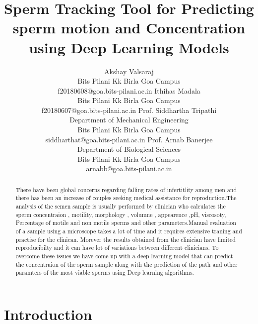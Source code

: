 \documentclass{article}
\title{
  Sperm Tracking Tool for Predicting sperm motion and Concentration using Deep Learning Models 
}
\author{%
  Akshay Valsaraj \\
  Bits Pilani Kk Birla Goa Campus\\
  f20180608@goa.bits-pilani.ac.in
  \And
  Ithihas Madala \\
  Bits Pilani Kk Birla Goa Campus\\
  f20180607@goa.bits-pilani.ac.in
  \And
  Prof. Siddhartha Tripathi \\
  Department of Mechanical Engineering \\
  Bits Pilani Kk Birla Goa Campus \\
  siddharthat@goa.bits-pilani.ac.in
  \And
  Prof. Arnab Banerjee \\
  Department of Biological Sciences \\ 
  Bits Pilani Kk Birla Goa Campus \\
  arnabb@goa.bits-pilani.ac.in
}
\begin{document}
\maketitle

\begin{abstract}
  There have been global concerns regarding falling rates of infertitlity among men and there has been 
  an increase of couples seeking medical assistance for reproduction.The analysis of the semen sample is usually performed by 
  clinician who calculates the sperm concentraion , motility, morphology , volumne , appearence ,pH, viscosoty, Percentage of motile and non motile sperms
  and other parameters.Manual evaluation of a sample using a microscope takes a lot of time and it requires extensive traning and practise for the clinican.
  Morever the results obtained from the clinician have limited reproducibilty and it can have lot of variations between different clinicians.
  To overcome these issues we have come up with a deep learning model that can predict the concentraion of the sperm sample along with the prediction of the path and other paramters of the most 
  viable sperms using Deep learning algorithms.

\end{abstract}

\section{Introduction}
\end{document}
